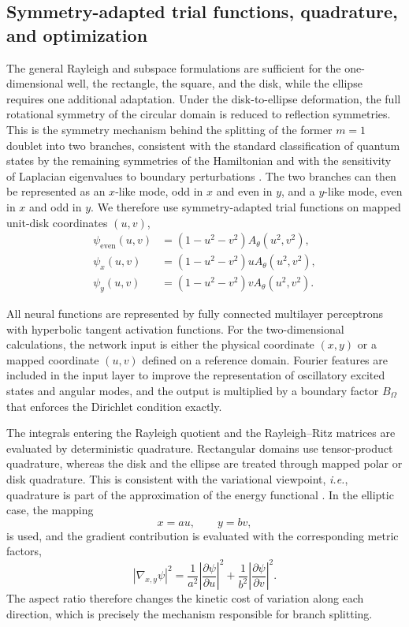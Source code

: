 \documentclass[10pt,onecolumn]{article}
\begin{document}
\subsection{Symmetry-adapted trial functions, quadrature, and optimization}

The general Rayleigh and subspace formulations are sufficient for the one-dimensional well, the rectangle, the square, and the disk, while the ellipse requires one additional adaptation. Under the disk-to-ellipse deformation, the full rotational symmetry of the circular domain is reduced to reflection symmetries. This is the symmetry mechanism behind the splitting of the former $m=1$ doublet into two branches, consistent with the standard classification of quantum states by the remaining symmetries of the Hamiltonian \cite{Tinkham1964,Sakurai2020} and with the sensitivity of Laplacian eigenvalues to boundary perturbations \cite{Henry2005}. The two branches can then be represented as an $x$-like mode, odd in $x$ and even in $y$, and a $y$-like mode, even in $x$ and odd in $y$. We therefore use symmetry-adapted trial functions on mapped unit-disk coordinates $(u,v)$,
\begin{align}
\psi_{\mathrm{even}}(u,v)
&=
(1-u^2-v^2)A_\theta(u^2,v^2),
\\
\psi_x(u,v)
&=
(1-u^2-v^2)uA_\theta(u^2,v^2),
\\
\psi_y(u,v)
&=
(1-u^2-v^2)vA_\theta(u^2,v^2).
\end{align}

All neural functions are represented by fully connected multilayer perceptrons with hyperbolic tangent activation functions. For the two-dimensional calculations, the network input is either the physical coordinate $(x,y)$ or a mapped coordinate $(u,v)$ defined on a reference domain. Fourier features are included in the input layer to improve the representation of oscillatory excited states and angular modes, and the output is multiplied by a boundary factor $B_\Omega$ that enforces the Dirichlet condition exactly.

The integrals entering the Rayleigh quotient and the Rayleigh--Ritz matrices are evaluated by deterministic quadrature. Rectangular domains use tensor-product quadrature, whereas the disk and the ellipse are treated through mapped polar or disk quadrature. This is consistent with the variational viewpoint, \textit{i.e.}, quadrature is part of the approximation of the energy functional \cite{Berrone2022}. In the elliptic case, the mapping
\begin{equation}
x=au,\qquad y=bv,
\end{equation}
is used, and the gradient contribution is evaluated with the corresponding metric factors,
\begin{equation}
|\nabla_{x,y}\psi|^2
=
\frac{1}{a^2}
\left|
\frac{\partial \psi}{\partial u}
\right|^2
+
\frac{1}{b^2}
\left|
\frac{\partial \psi}{\partial v}
\right|^2.
\end{equation}
The aspect ratio therefore changes the kinetic cost of variation along each direction, which is precisely the mechanism responsible for branch splitting.
\end{document}
